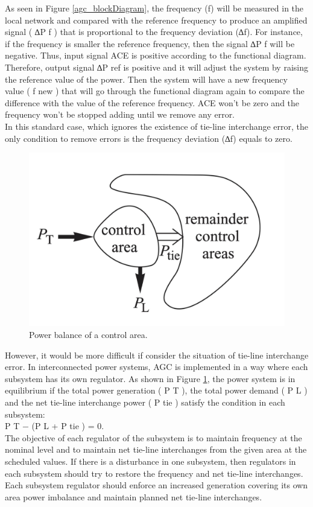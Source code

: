 \documentclass{report}
\begin{document}
As seen in Figure \ref{agc_blockDiagram}, the frequency (f) will be measured in the local network and compared with the reference frequency to produce an amplified signal ( ∆P f ) that is proportional to the frequency deviation (∆f). For instance, if the frequency is smaller the reference frequency, then the signal ∆P f will be negative. Thus, input signal ACE is positive according to the functional diagram. Therefore, output signal ∆P ref is positive and it will adjust the system by raising the reference value of the power. Then the system will have a new frequency value ( f new ) that will go through the functional diagram again to compare the difference with the value of the reference frequency. ACE won’t be zero and the frequency won’t be stopped adding until we remove any error.\\

In this standard case, which ignores the existence of tie-line interchange error, the only condition to remove errors is the frequency deviation (∆f) equals to zero.\\

\begin{figure}[htb]
\centering
\includegraphics[width = .618\textwidth]{Figure/controller_powerBalance.png}
\caption{Power balance of a control area.}
\label{controller_powerBalance}
\end{figure}

However, it would be more difficult if consider the situation of tie-line interchange error. In interconnected power systems, AGC is implemented in a way where each subsystem has its own regulator. As shown in Figure \ref{controller_powerBalance}, the power system is in equilibrium if the total power generation ( P T ), the total power demand ( P L ) and the net tie-line interchange power ( P tie ) satisfy the condition in each subsystem:\\
P T − (P L + P tie ) = 0.\\

The objective of each regulator of the subsystem is to maintain frequency at the nominal level and to maintain net tie-line interchanges from the given area at the scheduled values. If there is a disturbance in one subsystem, then regulators in each subsystem should try to restore the frequency and net tie-line interchanges. Each subsystem regulator should enforce an increased generation covering its own area power imbalance and maintain planned net tie-line interchanges.\\
\end{document}
